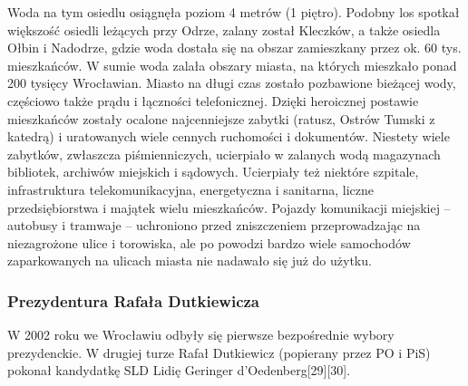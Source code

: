 \documentclass{article}
\begin{document}
Woda na tym osiedlu osiągnęła poziom 4 metrów (1 piętro). Podobny los spotkał większość osiedli leżących przy Odrze, zalany został Kleczków, a także osiedla Ołbin i Nadodrze, gdzie woda dostała się na obszar zamieszkany przez ok. 60 tys. mieszkańców. W sumie woda zalała obszary miasta, na których mieszkało ponad 200 tysięcy Wrocławian. Miasto na długi czas zostało pozbawione bieżącej wody, częściowo także prądu i łączności telefonicznej. Dzięki heroicznej postawie mieszkańców zostały ocalone najcenniejsze zabytki (ratusz, Ostrów Tumski z katedrą) i uratowanych wiele cennych ruchomości i dokumentów. Niestety wiele zabytków, zwłaszcza piśmienniczych, ucierpiało w zalanych wodą magazynach bibliotek, archiwów miejskich i sądowych. Ucierpiały też niektóre szpitale, infrastruktura telekomunikacyjna, energetyczna i sanitarna, liczne przedsiębiorstwa i majątek wielu mieszkańców. Pojazdy komunikacji miejskiej – autobusy i tramwaje – uchroniono przed zniszczeniem przeprowadzając na niezagrożone ulice i torowiska, ale po powodzi bardzo wiele samochodów zaparkowanych na ulicach miasta nie nadawało się już do użytku.

\subsubsection{Prezydentura Rafała Dutkiewicza}
W 2002 roku we Wrocławiu odbyły się pierwsze bezpośrednie wybory prezydenckie. W drugiej turze Rafał Dutkiewicz (popierany przez PO i PiS) pokonał kandydatkę SLD Lidię Geringer d’Oedenberg[29][30].
\end{document}
